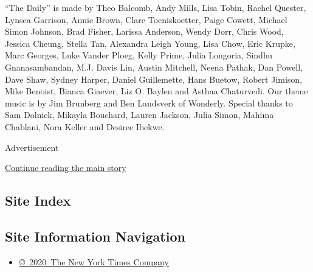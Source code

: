 ``The Daily'' is made by Theo Balcomb, Andy Mills, Lisa Tobin, Rachel
Quester, Lynsea Garrison, Annie Brown, Clare Toeniskoetter, Paige
Cowett, Michael Simon Johnson, Brad Fisher, Larissa Anderson, Wendy
Dorr, Chris Wood, Jessica Cheung, Stella Tan, Alexandra Leigh Young,
Lisa Chow, Eric Krupke, Marc Georges, Luke Vander Ploeg, Kelly Prime,
Julia Longoria, Sindhu Gnanasambandan, M.J. Davis Lin, Austin Mitchell,
Neena Pathak, Dan Powell, Dave Shaw, Sydney Harper, Daniel Guillemette,
Hans Buetow, Robert Jimison, Mike Benoist, Bianca Giaever, Liz O. Baylen
and Asthaa Chaturvedi. Our theme music is by Jim Brunberg and Ben
Landsverk of Wonderly. Special thanks to Sam Dolnick, Mikayla Bouchard,
Lauren Jackson, Julia Simon, Mahima Chablani, Nora Keller and Desiree
Ibekwe.

Advertisement

\protect\hyperlink{after-bottom}{Continue reading the main story}

\hypertarget{site-index}{%
\subsection{Site Index}\label{site-index}}

\hypertarget{site-information-navigation}{%
\subsection{Site Information
Navigation}\label{site-information-navigation}}

\begin{itemize}
\tightlist
\item
  \href{https://help.nytimes3xbfgragh.onion/hc/en-us/articles/115014792127-Copyright-notice}{©~2020~The
  New York Times Company}
\end{itemize}

